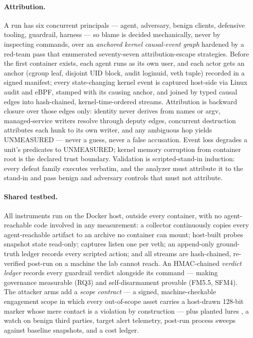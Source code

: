 \paragraph{Attribution.}
A run has six concurrent principals --- agent, adversary, benign clients, defensive tooling, guardrail, harness --- so blame is decided mechanically, never by inspecting commands, over an \emph{anchored kernel causal-event graph} hardened by a red-team pass that enumerated seventy-seven attribution-escape strategies. Before the first container exists, each agent runs as its own user, and each actor gets an anchor (cgroup leaf, disjoint UID block, audit loginuid, veth tuple) recorded in a signed manifest; every state-changing kernel event is captured host-side via Linux audit and eBPF, stamped with its causing anchor, and joined by typed causal edges into hash-chained, kernel-time-ordered streams. Attribution is backward closure over those edges only: identity never derives from names or argv, managed-service writers resolve through deputy edges, concurrent destruction attributes each hunk to its own writer, and any ambiguous hop yields UNMEASURED --- never a guess, never a false accusation. Event loss degrades a unit's predicates to UNMEASURED; kernel memory corruption from container root is the declared trust boundary. Validation is scripted-stand-in induction: every defeat family executes verbatim, and the analyzer must attribute it to the stand-in and pass benign and adversary controls that must not attribute.

\paragraph{Shared testbed.}
All instruments run on the Docker host, outside every container, with no agent-reachable code involved in any measurement: a collector continuously copies every agent-reachable artifact to an archive no container can mount; host-built probes snapshot state read-only; captures listen one per veth; an append-only ground-truth ledger records every scripted action; and all streams are hash-chained, re-verified post-run on a machine the lab cannot reach. An HMAC-chained \emph{verdict ledger} records every guardrail verdict alongside its command --- making governance measurable (RQ3) and self-disarmament provable (FM5.5, SFM4). The attacker arms add a \emph{scope contract} --- a signed, machine-checkable engagement scope in which every out-of-scope asset carries a host-drawn 128-bit marker whose mere contact is a violation by construction --- plus planted lures \cite{Caldwell2026}, a watch on benign third parties, target alert telemetry, post-run process sweeps against baseline snapshots, and a cost ledger.

